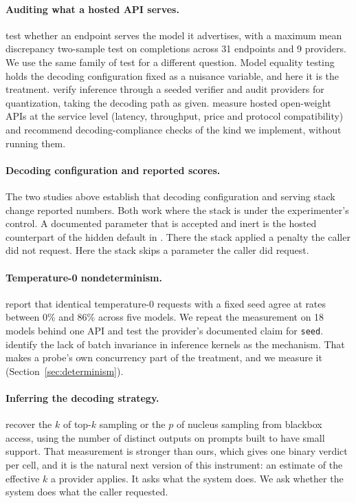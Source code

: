 \documentclass[10pt]{article}
\newcommand{\p}[1]{\texttt{#1}}
\begin{document}
\paragraph{Auditing what a hosted API serves.}
\citet{gao2025modelequality} test whether an endpoint serves the model it advertises, with a maximum mean discrepancy two-sample test on completions across 31 endpoints and 9 providers. We use the same family of test for a different question. Model equality testing holds the decoding configuration fixed as a nuisance variable, and here it is the treatment. \citet{karvonen2025difr} verify inference through a seeded verifier and audit providers for quantization, taking the decoding path as given. \citet{li2026sameservice} measure hosted open-weight APIs at the service level (latency, throughput, price and protocol compatibility) and recommend decoding-compliance checks of the kind we implement, without running them.

\paragraph{Decoding configuration and reported scores.}
The two studies above \citep{hochlehnert2025sober,pape2026silent} establish that decoding configuration and serving stack change reported numbers. Both work where the stack is under the experimenter's control. A documented parameter that is accepted and inert is the hosted counterpart of the hidden default in \citet{pape2026silent}. There the stack applied a penalty the caller did not request. Here the stack skips a parameter the caller did request.

\paragraph{Temperature-0 nondeterminism.}
\citet{atil2024nondeterminism} report that identical temperature-0 requests with a fixed seed agree at rates between 0\% and 86\% across five models. We repeat the measurement on 18 models behind one API and test the provider's documented claim for \p{seed}. \citet{he2025defeating} identify the lack of batch invariance in inference kernels as the mechanism. That makes a probe's own concurrency part of the treatment, and we measure it (Section~\ref{sec:determinism}).

\paragraph{Inferring the decoding strategy.}
\citet{ippolito2023reverse} recover the $k$ of top-$k$ sampling or the $p$ of nucleus sampling from blackbox access, using the number of distinct outputs on prompts built to have small support. That measurement is stronger than ours, which gives one binary verdict per cell, and it is the natural next version of this instrument: an estimate of the effective $k$ a provider applies. It asks what the system does. We ask whether the system does what the caller requested.
\end{document}
